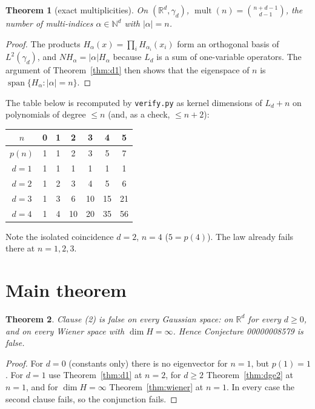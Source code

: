 \documentclass[11pt]{article}
\newtheorem{theorem}{Theorem}
\theoremstyle{definition}
\theoremstyle{remark}
\newcommand{\N}{\mathbb{N}}
\newcommand{\R}{\mathbb{R}}
\newcommand{\mult}{\operatorname{mult}}
\begin{document}
\begin{theorem}[exact multiplicities]\label{thm:exact}
On $(\R^d,\gamma_d)$, $\mult(n)=\binom{n+d-1}{d-1}$, the number of multi-indices
$\alpha\in\N^d$ with $|\alpha|=n$.
\end{theorem}
\begin{proof}
The products $H_\alpha(x)=\prod_iH_{\alpha_i}(x_i)$ form an orthogonal basis of
$L^2(\gamma_d)$, and $NH_\alpha=|\alpha|H_\alpha$ because $L_d$ is a sum of
one-variable operators. The argument of Theorem~\ref{thm:d1} then shows that the
eigenspace of $n$ is $\operatorname{span}\{H_\alpha:|\alpha|=n\}$.
\end{proof}
The table below is recomputed by \texttt{verify.py} as kernel dimensions of $L_d+n$
on polynomials of degree $\le n$ (and, as a check, $\le n+2$):
\begin{center}
\begin{tabular}{c|cccccc}
$n$ & 0&1&2&3&4&5\\\hline
$p(n)$ & 1&1&2&3&5&7\\
$d=1$ & 1&1&1&1&1&1\\
$d=2$ & 1&2&3&4&5&6\\
$d=3$ & 1&3&6&10&15&21\\
$d=4$ & 1&4&10&20&35&56
\end{tabular}
\end{center}
Note the isolated coincidence $d=2$, $n=4$ ($5=p(4)$). The law already fails there
at $n=1,2,3$.

\section{Main theorem}
\begin{theorem}\label{thm:main}
Clause (2) is false on every Gaussian space: on $\R^d$ for every $d\ge0$, and on
every Wiener space with $\dim H=\infty$. Hence Conjecture 00000008579 is false.
\end{theorem}
\begin{proof}
For $d=0$ (constants only) there is no eigenvector for $n=1$, but $p(1)=1$.
For $d=1$ use Theorem~\ref{thm:d1} at $n=2$, for $d\ge2$ Theorem~\ref{thm:dge2} at $n=1$,
and for $\dim H=\infty$ Theorem~\ref{thm:wiener} at $n=1$. In every case the second
clause fails, so the conjunction fails.
\end{proof}
\end{document}
